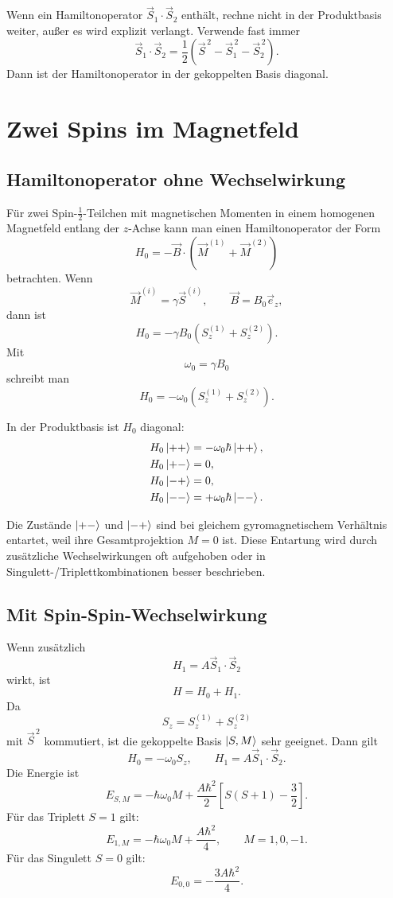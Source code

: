 \begin{examtipbox}
Wenn ein Hamiltonoperator \(\vec S_1\cdot\vec S_2\) enthält, rechne nicht in der Produktbasis weiter, außer es wird explizit verlangt. Verwende fast immer
\[
    \vec S_1\cdot\vec S_2
    =\frac12(\vec S^{\,2}-\vec S_1^{\,2}-\vec S_2^{\,2}).
\]
Dann ist der Hamiltonoperator in der gekoppelten Basis diagonal.
\end{examtipbox}

\section{Zwei Spins im Magnetfeld}

\subsection{Hamiltonoperator ohne Wechselwirkung}

Für zwei Spin-\(\frac12\)-Teilchen mit magnetischen Momenten in einem homogenen Magnetfeld entlang der \(z\)-Achse kann man einen Hamiltonoperator der Form
\[
    H_0=-\vec B\cdot(\vec M^{(1)}+\vec M^{(2)})
\]
betrachten. Wenn
\[
    \vec M^{(i)}=\gamma\vec S^{(i)},
    \qquad
    \vec B=B_0\vec e_z,
\]
dann ist
\[
    H_0=-\gamma B_0(S^{(1)}_z+S^{(2)}_z).
\]
Mit
\[
    \omega_0=\gamma B_0
\]
schreibt man
\[
    H_0=-\omega_0(S^{(1)}_z+S^{(2)}_z).
\]

In der Produktbasis ist \(H_0\) diagonal:
\begin{align*}
    H_0\left|++\right\rangle&=-\omega_0\hbar\left|++\right\rangle,\\
    H_0\left|+-\right\rangle&=0,\\
    H_0\left|-+\right\rangle&=0,\\
    H_0\left|--\right\rangle&=+\omega_0\hbar\left|--\right\rangle.
\end{align*}

\begin{conceptbox}
Die Zustände \(\left|+-\right\rangle\) und \(\left|-+\right\rangle\) sind bei gleichem gyromagnetischem Verhältnis entartet, weil ihre Gesamtprojektion \(M=0\) ist. Diese Entartung wird durch zusätzliche Wechselwirkungen oft aufgehoben oder in Singulett-/Triplettkombinationen besser beschrieben.
\end{conceptbox}

\subsection{Mit Spin-Spin-Wechselwirkung}

Wenn zusätzlich
\[
    H_1=A\vec S_1\cdot\vec S_2
\]
wirkt, ist
\[
    H=H_0+H_1.
\]
Da
\[
    S_z=S^{(1)}_z+S^{(2)}_z
\]
mit \(\vec S^{\,2}\) kommutiert, ist die gekoppelte Basis \(\left|S,M\right\rangle\) sehr geeignet. Dann gilt
\[
    H_0=-\omega_0 S_z,
    \qquad
    H_1=A\vec S_1\cdot\vec S_2.
\]
Die Energie ist
\[
    E_{S,M}=-\hbar\omega_0 M
    +\frac{A\hbar^2}{2}\left[S(S+1)-\frac32\right].
\]
Für das Triplett \(S=1\) gilt:
\[
    E_{1,M}=-\hbar\omega_0 M+\frac{A\hbar^2}{4},
    \qquad M=1,0,-1.
\]
Für das Singulett \(S=0\) gilt:
\[
    E_{0,0}=-\frac{3A\hbar^2}{4}.
\]

